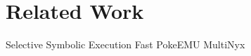 
\chapter{Related Work}\label{chapter:related_work}


Selective Symbolic Execution
Fast PokeEMU
MultiNyx
